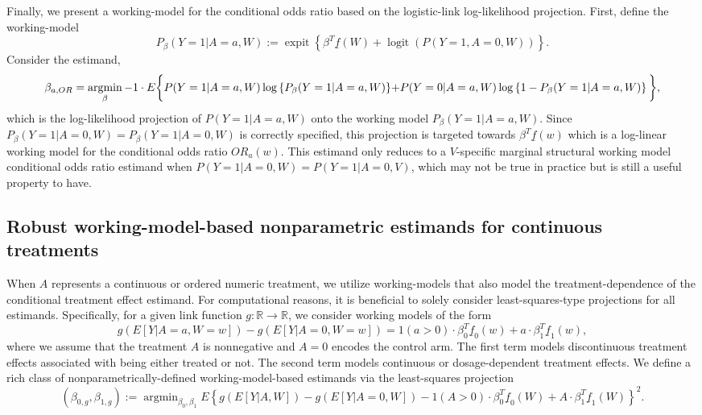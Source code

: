 \documentclass[
]{jss}
\DeclareMathOperator{\logit}{logit}
\DeclareMathOperator{\argmin}{argmin}
\DeclareMathOperator{\expit}{expit}
\begin{document}
Finally, we present a working-model for the conditional odds ratio based
on the logistic-link log-likelihood projection. First, define the
working-model
\[P_{\beta}(Y=1|A=a,W) :=  \expit\left\{\beta^T \underline{f}(W)  + \logit(P(Y=1,A=0,W))\right\}.\]
Consider the estimand, \begin{equation}
\beta_{a,OR} = \argmin_{\beta} -1 \cdot E\bigg\{P(Y=1|A=a,W)\log \left\{P_{\beta}(Y=1|A=a,W)\right\} $$
$$+ P(Y=0|A=a,W)\log \left\{1-P_{\beta}(Y=1|A=a,W)\right\} \bigg\},
\label{eqn::estimandNPOR}
\end{equation} which is the log-likelihood projection of
\(P(Y=1|A=a,W)\) onto the working model \(P_{\beta}(Y=1|A=a,W)\). Since
\(P_{\beta}(Y=1|A=0,W) = P_{\beta}(Y=1|A=0,W)\) is correctly specified,
this projection is targeted towards \(\beta^T \underline{f}(w)\) which
is a log-linear working model for the conditional odds ratio
\(OR_a(w)\). This estimand only reduces to a \(V\)-specific marginal
structural working model conditional odds ratio estimand when
\(P(Y=1|A=0,W) = P(Y=1|A=0,V)\), which may not be true in practice but
is still a useful property to have.

\subsection{Robust working-model-based nonparametric estimands for continuous treatments}\label{section::estimandNPcont}

When \(A\) represents a continuous or ordered numeric treatment, we
utilize working-models that also model the treatment-dependence of the
conditional treatment effect estimand. For computational reasons, it is
beneficial to solely consider least-squares-type projections for all
estimands. Specifically, for a given link function
\(g:\mathbb{R} \rightarrow \mathbb{R}\), we consider working models of
the form
\[g(E[Y|A=a,W=w]) - g(E[Y|A=0,W=w]) = 1(a>0)\cdot \beta_0^T \underline{f}_0(w) +  a \cdot \beta_1^T \underline{f}_1(w),\]
where we assume that the treatment \(A\) is nonnegative and \(A=0\)
encodes the control arm. The first term models discontinuous treatment
effects associated with being either treated or not. The second term
models continuous or dosage-dependent treatment effects. We define a
rich class of nonparametrically-defined working-model-based estimands
via the least-squares projection
\[(\beta_{0,g}, \beta_{1,g}) := \argmin_{\beta_0, \beta_1} E \left\{ g(E[Y|A,W]) - g(E[Y|A=0,W])  - 1(A>0)\cdot \beta_0^T \underline{f}_0(W) +  A \cdot \beta_1^T \underline{f}_1(W)\right\}^2.\]
\end{document}
